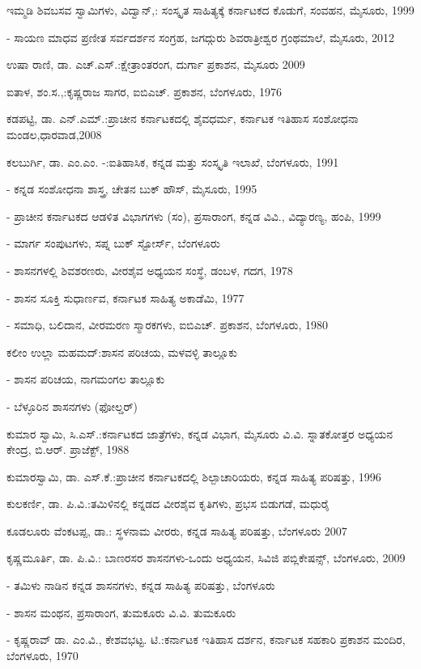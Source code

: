 \noindent
ಇಮ್ಮಡಿ ಶಿವಬಸವ ಸ್ವಾಮಿಗಳು, ವಿದ್ವಾನ್​,: ಸಂಸ್ಕೃತ ಸಾಹಿತ್ಯಕ್ಕೆ ಕರ್ನಾಟಕದ ಕೊಡುಗೆ, ಸಂವಹನ, ಮೈಸೂರು, 1999


- ಸಾಯಣ ಮಾಧವ ಪ್ರಣೀತ ಸರ್ವದರ್ಶನ ಸಂಗ್ರಹ, ಜಗದ್ಗುರು ಶಿವರಾತ್ರೀಶ್ವರ ಗ್ರಂಥಮಾಲೆ, ಮೈಸೂರು, 2012

\noindent
ಉಷಾ ರಾಣಿ, ಡಾ. ಎಚ್​.ಎಸ್​.:ಕ್ಷೇತ್ರಾಂತರಂಗ, ದುರ್ಗಾ ಪ್ರಕಾಶನ, ಮೈಸೂರು 2009

\noindent
ಐತಾಳ, ಶಂ.ಸ.,:ಕೃಷ್ಣರಾಜ ಸಾಗರ, ಐಬಿಎಚ್​. ಪ್ರಕಾಶನ, ಬೆಂಗಳೂರು, 1976

\noindent
ಕಡಪಟ್ಟಿ, ಡಾ. ಎನ್​.ಎಮ್.:ಪ್ರಾಚೀನ ಕರ್ನಾಟಕದಲ್ಲಿ ಶೈವಧರ್ಮ, ಕರ್ನಾಟಕ ಇತಿಹಾಸ ಸಂಶೋಧನಾ ಮಂಡಲ,\break ಧಾರವಾಡ,2008

\noindent
ಕಲಬುರ್ಗಿ, ಡಾ. ಎಂ.ಎಂ. -:ಐತಿಹಾಸಿಕ, ಕನ್ನಡ ಮತ್ತು ಸಂಸ್ಕೃತಿ ಇಲಾಖೆ, ಬೆಂಗಳೂರು, 1991

- ಕನ್ನಡ ಸಂಶೋಧನಾ ಶಾಸ್ತ್ರ, ಚೇತನ ಬುಕ್​ ಹೌಸ್​, ಮೈಸೂರು, 1995

- ಪ್ರಾಚೀನ ಕರ್ನಾಟಕದ ಆಡಳಿತ ವಿಭಾಗಗಳು (ಸಂ), ಪ್ರಸಾರಾಂಗ, ಕನ್ನಡ ವಿವಿ., ವಿದ್ಯಾರಣ್ಯ, ಹಂಪಿ, 1999

- ಮಾರ್ಗ ಸಂಪುಟಗಳು, ಸಪ್ನ ಬುಕ್​ ಸ್ಟೋರ್ಸ್, ಬೆಂಗಳೂರು 

- ಶಾಸನಗಳಲ್ಲಿ ಶಿವಶರಣರು, ವೀರಶೈವ ಅಧ್ಯಯನ ಸಂಸ್ಥೆ, ಡಂಬಳ, ಗದಗ, 1978

- ಶಾಸನ ಸೂಕ್ತಿ ಸುಧಾರ್ಣವ, ಕರ್ನಾಟಕ ಸಾಹಿತ್ಯ ಅಕಾಡೆಮಿ, 1977

- ಸಮಾಧಿ, ಬಲಿದಾನ, ವೀರಮರಣ ಸ್ಮಾರಕಗಳು, ಐಬಿಎಚ್​. ಪ್ರಕಾಶನ, ಬೆಂಗಳೂರು, 1980

\noindent
ಕಲೀಂ ಉಲ್ಲಾ ಮಹಮದ್​:ಶಾಸನ ಪರಿಚಯ, ಮಳವಳ್ಳಿ ತಾಲ್ಲೂಕು

- ಶಾಸನ ಪರಿಚಯ, ನಾಗಮಂಗಲ ತಾಲ್ಲೂಕು

- ಬೆಳ್ಳೂರಿನ ಶಾಸನಗಳು (ಫೋಲ್ಡರ್​)

\noindent
ಕುಮಾರ ಸ್ವಾಮಿ, ಸಿ.ಎಸ್​.:ಕರ್ನಾಟಕದ ಜಾತ್ರೆಗಳು, ಕನ್ನಡ ವಿಭಾಗ, ಮೈಸೂರು ವಿ.ವಿ. ಸ್ನಾತಕೋತ್ತರ ಅಧ್ಯಯನ ಕೇಂದ್ರ, ಬಿ.ಆರ್​. ಪ್ರಾಜೆಕ್ಟ್​, 1988

\noindent
ಕುಮಾರಸ್ವಾಮಿ, ಡಾ. ಎಸ್​.ಕೆ.:ಪ್ರಾಚೀನ ಕರ್ನಾಟಕದಲ್ಲಿ ಶಿಲ್ಪಾಚಾರಿಯರು, ಕನ್ನಡ ಸಾಹಿತ್ಯ ಪರಿಷತ್ತು, 1996

\noindent
ಕುಲಕರ್ಣಿ, ಡಾ. ಪಿ.ವಿ.:ತಮಿಳಿನಲ್ಲಿ ಕನ್ನಡದ ವೀರಶೈವ ಕೃತಿಗಳು, ಪ್ರಭಸ ಬಿಡುಗಡೆ, ಮಧುರೈ

\noindent
ಕೂಡಲೂರು ವೆಂಕಟಪ್ಪ, ಡಾ.: ಸ್ಥಳನಾಮ ವೀರರು, ಕನ್ನಡ ಸಾಹಿತ್ಯ ಪರಿಷತ್ತು, ಬೆಂಗಳೂರು 2007

\noindent
ಕೃಷ್ಣಮೂರ್ತಿ, ಡಾ. ಪಿ.ವಿ.: ಬಾಣರಸರ ಶಾಸನಗಳು-ಒಂದು ಅಧ್ಯಯನ, ಸಿವಿಜಿ ಪಬ್ಲಿಕೇಷನ್ಸ್​, ಬೆಂಗಳೂರು, 2009

- ತಮಿಳು ನಾಡಿನ ಕನ್ನಡ ಶಾಸನಗಳು, ಕನ್ನಡ ಸಾಹಿತ್ಯ ಪರಿಷತ್ತು, ಬೆಂಗಳೂರು

- ಶಾಸನ ಮಂಥನ, ಪ್ರಸಾರಾಂಗ, ತುಮಕೂರು ವಿ.ವಿ. ತುಮಕೂರು

- ಕೃಷ್ಣರಾವ್​ ಡಾ. ಎಂ.ವಿ., ಕೇಶವಭಟ್ಟ. ಟಿ.:ಕರ್ನಾಟಕ ಇತಿಹಾಸ ದರ್ಶನ, ಕರ್ನಾಟಕ ಸಹಕಾರಿ ಪ್ರಕಾಶನ ಮಂದಿರ, ಬೆಂಗಳೂರು, 1970

